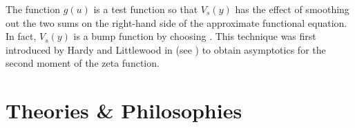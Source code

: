       The function $g(u)$ is a test function so that $V_{s}(y)$ has the effect of smoothing out the two sums on the right-hand side of the approximate functional equation. In fact, $V_{s}(y)$ is a bump function by choosing . This technique was first introduced by Hardy and Littlewood in  (see ) to obtain asymptotics for the second moment of the zeta function.
  \chapter{Theories \& Philosophies}